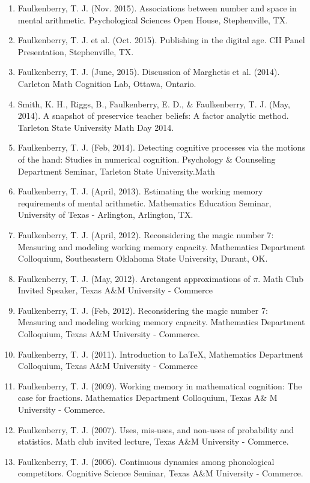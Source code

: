 \documentclass[article,10pt]{article}
\begin{document}
\begin{enumerate}
\item Faulkenberry, T. J. (Nov. 2015). Associations between number and space in mental arithmetic.  Psychological Sciences Open House, Stephenville, TX.
\item Faulkenberry, T. J. et al. (Oct. 2015). Publishing in the digital age.  CII Panel Presentation, Stephenville, TX.
\item Faulkenberry, T. J. (June, 2015). Discussion of Marghetis et al. (2014). Carleton Math Cognition Lab, Ottawa, Ontario.
\item Smith, K. H., Riggs, B., Faulkenberry, E. D., \& Faulkenberry, T. J. (May, 2014). A snapshot of preservice teacher beliefs: A factor analytic method. Tarleton State University Math Day 2014.
\item Faulkenberry, T. J. (Feb, 2014). Detecting cognitive processes via the motions of the hand: Studies in numerical cognition.  Psychology \& Counseling Department Seminar, Tarleton State University.Math
\item Faulkenberry, T. J. (April, 2013). Estimating the working memory requirements of mental arithmetic. Mathematics Education Seminar, University of Texas - Arlington, Arlington, TX.
\item Faulkenberry, T. J. (April, 2012). Reconsidering the magic number 7: Measuring and modeling working memory capacity. Mathematics Department Colloquium, Southeastern Oklahoma State University, Durant, OK.
\item Faulkenberry, T. J. (May, 2012). Arctangent approximations of \(\pi\). Math Club Invited Speaker, Texas A\&M University - Commerce
\item Faulkenberry, T. J. (Feb, 2012). Reconsidering the magic number 7: Measuring and modeling working memory capacity. Mathematics Department Colloquium, Texas A\&M University - Commerce.
\item Faulkenberry, T. J. (2011). Introduction to \LaTeX{}, Mathematics Department Colloquium, Texas A\&M University - Commerce
\item Faulkenberry, T. J. (2009). Working memory in mathematical cognition: The case for fractions. Mathematics Department Colloquium, Texas A\& M University - Commerce.
\item Faulkenberry, T. J. (2007). Uses, mis-uses, and non-uses of probability and statistics. Math club invited lecture, Texas A\&M University - Commerce.
\item Faulkenberry, T. J. (2006). Continuous dynamics among phonological competitors. Cognitive Science Seminar, Texas A\&M University - Commerce.

\end{enumerate}
\end{document}
